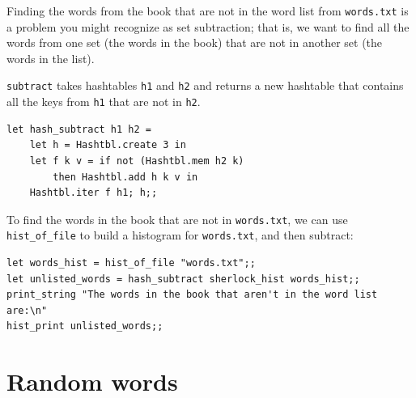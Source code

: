 \documentclass[10pt]{book}
\begin{document}

Finding the words from the book that are not in the word list
from {\tt words.txt} is a problem you might recognize as set
subtraction; that is, we want to find all the words from one
set (the words in the book) that are not in another set (the
words in the list).

{\tt subtract} takes hashtables {\tt h1} and {\tt h2} and returns a
new hashtable that contains all the keys from {\tt h1} that are not
in {\tt h2}.

\beforeverb
\begin{verbatim}
let hash_subtract h1 h2 =
	let h = Hashtbl.create 3 in
	let f k v = if not (Hashtbl.mem h2 k)
		then Hashtbl.add h k v in
	Hashtbl.iter f h1; h;;
\end{verbatim}
\afterverb
%
To find the words in the book that are not in {\tt words.txt},
we can use \verb"hist_of_file" to build a histogram for
{\tt words.txt}, and then subtract:

\beforeverb
\begin{verbatim}
let words_hist = hist_of_file "words.txt";;
let unlisted_words = hash_subtract sherlock_hist words_hist;;
print_string "The words in the book that aren't in the word list are:\n"
hist_print unlisted_words;;
\end{verbatim}
\afterverb
%

% 


\section{Random words}
\label{randomwords}

\end{document}
